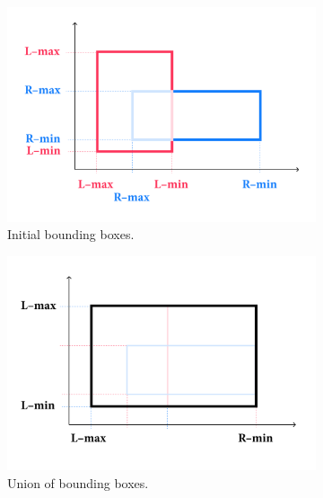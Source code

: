 \documentclass[a4paper,11pt,oneside]{article}
\begin{document}
\begin{figure}[ht]
	\centering
	\begin{subfigure}[b]{0.4\textwidth}
		\centering
		\includegraphics[width=\linewidth]{section4/4.2/box-enclosure-initial.png}
		\caption{Initial bounding boxes.}
		\label{sec4.2:composite-box-base}
	\end{subfigure}
	\hfill
	\begin{subfigure}[b]{0.4\textwidth}
		\centering
		\includegraphics[width=\linewidth]{section4/4.2/box-enclosure-union.png}
		\caption{Union of bounding boxes.}
		\label{sec4.2:composite-box-union}
	\end{subfigure}
	\medskip
	\begin{subfigure}[b]{0.4\textwidth}
		\centering

\end{subfigure}
\end{figure}
\end{document}
